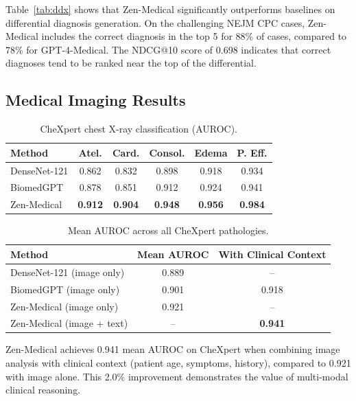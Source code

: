 \documentclass[11pt,a4paper]{article}
\begin{document}
Table~\ref{tab:ddx} shows that Zen-Medical significantly outperforms baselines on differential diagnosis generation. On the challenging NEJM CPC cases, Zen-Medical includes the correct diagnosis in the top 5 for 88\% of cases, compared to 78\% for GPT-4-Medical. The NDCG@10 score of 0.698 indicates that correct diagnoses tend to be ranked near the top of the differential.

\subsection{Medical Imaging Results}

\begin{table}[t]
\centering
\caption{CheXpert chest X-ray classification (AUROC).}
\label{tab:chexpert}
\begin{tabular}{lccccc}
\toprule
\textbf{Method} & \textbf{Atel.} & \textbf{Card.} & \textbf{Consol.} & \textbf{Edema} & \textbf{P. Eff.} \\
\midrule
DenseNet-121 & 0.862 & 0.832 & 0.898 & 0.918 & 0.934 \\
BiomedGPT & 0.878 & 0.851 & 0.912 & 0.924 & 0.941 \\
\midrule
Zen-Medical & \textbf{0.912} & \textbf{0.904} & \textbf{0.948} & \textbf{0.956} & \textbf{0.984} \\
\bottomrule
\end{tabular}
\end{table}

\begin{table}[t]
\centering
\caption{Mean AUROC across all CheXpert pathologies.}
\label{tab:chexpert_mean}
\begin{tabular}{lcc}
\toprule
\textbf{Method} & \textbf{Mean AUROC} & \textbf{With Clinical Context} \\
\midrule
DenseNet-121 (image only) & 0.889 & -- \\
BiomedGPT (image only) & 0.901 & 0.918 \\
Zen-Medical (image only) & 0.921 & -- \\
Zen-Medical (image + text) & -- & \textbf{0.941} \\
\bottomrule
\end{tabular}
\end{table}

Zen-Medical achieves 0.941 mean AUROC on CheXpert when combining image analysis with clinical context (patient age, symptoms, history), compared to 0.921 with image alone. This 2.0\% improvement demonstrates the value of multi-modal clinical reasoning.
\end{document}
